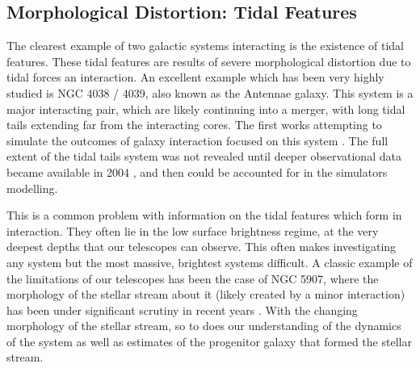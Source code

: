 \subsection{Morphological Distortion: Tidal Features}
\noindent The clearest example of two galactic systems interacting is the existence of tidal features. These tidal features are results of severe morphological distortion due to tidal forces an interaction. An excellent example which has been very highly studied is NGC 4038 / 4039, also known as the Antennae galaxy. This system is a major interacting pair, which are likely continuing into a merger, with long tidal tails extending far from the interacting cores. The first works attempting to simulate the outcomes of galaxy interaction focused on this system \citep{Works like TandT which looked at this}. The full extent of the tidal tails system was not revealed until deeper observational data became available in 2004 \citep{Citation from BandM}, and then could be accounted for in the simulators modelling.

This is a common problem with information on the tidal features which form in interaction. They often lie in the low surface brightness regime, at the very deepest depths that our telescopes can observe. This often makes investigating any system but the most massive, brightest systems difficult. A classic example of the limitations of our telescopes has been the case of NGC 5907, where the morphology of the stellar stream about it (likely created by a minor interaction) has been under significant scrutiny in recent years \citep{If this paragraph remains here, cite the different NGC 5907 papers}. With the changing morphology of the stellar stream, so to does our understanding of the dynamics of the system as well as estimates of the progenitor galaxy that formed the stellar stream. 

